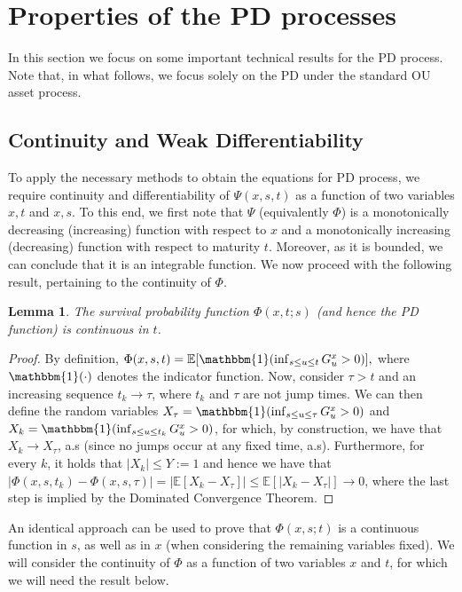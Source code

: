 \documentclass[11pt,reqno]{article}
\newtheorem{lemma}[theorem]{Lemma}
\theoremstyle{definition}
\begin{document}
\section{Properties of the PD processes}
In this section we focus on some important technical results for the PD process. Note that, in what follows, we focus solely on the PD under the standard OU asset process.

\subsection{Continuity and Weak Differentiability}
\par To apply the necessary methods to obtain the equations for PD process, we require continuity and differentiability of $\Psi(x,s,t)$ as a function of two variables $x,t$ and $x,s$. To this end, we first note that $\Psi$ (equivalently $\Phi$) is a monotonically decreasing (increasing) function with respect to $x$ and a monotonically increasing (decreasing) function with respect to maturity $t$. Moreover, as it is bounded, we can conclude that it is an integrable function. We now proceed with the following result, pertaining to the continuity of $\Phi$.


\begin{lemma} \label{cont1}
	The survival probability function $\Phi(x,t;s)$ (and hence the PD function) is continuous in $t$.
\end{lemma}
\begin{proof}
	By definition, $\Phi(x,s,t)= \mathbb{E}[\mathbbm{1}(\inf_{\substack{s \leq u \leq t}} G_u^x >0)],$ where $\mathbbm{1}(\cdot)$ denotes the indicator function. Now, consider $\tau > t $ and an increasing sequence $t_k \rightarrow \tau$, where $t_k$ and $\tau$ are not jump times. We can then define the random variables $X_\tau = \mathbbm{1}(\inf_{\substack{s \leq u \leq \tau}} G_u^x >0)$ and $X_{k} =\mathbbm{1}(\inf_{\substack{s \leq u \leq t_k}} G_u^x >0)$, for which, by construction, we have that $X_k \rightarrow X_\tau$, a.s (since no jumps occur at any fixed time, a.s). Furthermore, for every $k$, it holds that $|X_k| \leq Y:=1$ and hence we have that $|\Phi(x,s,t_k) -\Phi(x,s,\tau)|=|\mathbb{E}[X_k-X_\tau]| \leq \mathbb{E}[|X_k-X_\tau|] \rightarrow 0$, where the last step is implied by the Dominated Convergence Theorem.
\end{proof}

An identical approach can be used to prove that $\Phi(x,s;t)$ is a continuous function in $s$, as well as in $x$ (when considering the remaining variables fixed). We will consider the continuity of $\Phi$ as a function of two variables $x$ and $t$, for which we will need the result below. 
\end{document}
